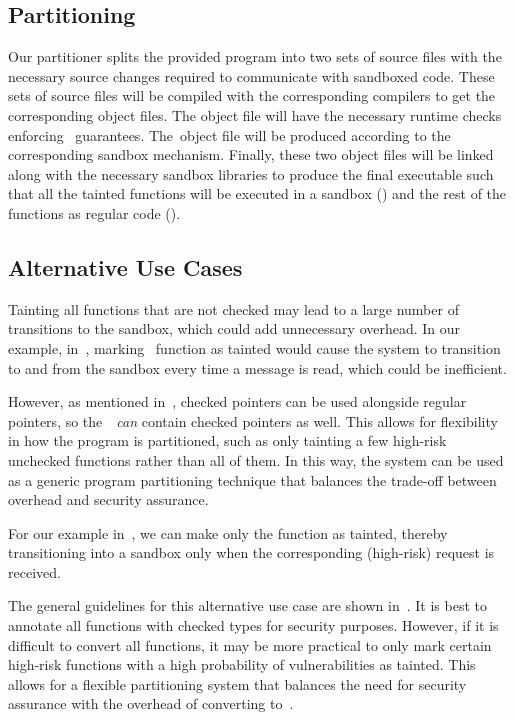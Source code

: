 \subsection{Partitioning}
Our partitioner splits the provided program into two sets of source files with the necessary source changes required to communicate with sandboxed code.
These sets of source files will be compiled with the corresponding compilers to get the corresponding object files.
The \cregion object file will have the necessary runtime checks enforcing~\systemname{} guarantees.
The~\ucregion object file will be produced according to the corresponding sandbox mechanism.
Finally, these two object files will be linked along with the necessary sandbox libraries to produce the final executable such that all the tainted functions will be executed in a sandbox (\ucregion) and the rest of the functions as regular code (\cregion).


\subsection{Alternative Use Cases}


Tainting all functions that are not checked may lead to a large number of transitions to the sandbox, which could add unnecessary overhead. In our example, in~, marking~ function as tainted would cause the system to transition to and from the sandbox every time a message is read, which could be inefficient. 

However, as mentioned in~, checked pointers can be used alongside regular pointers, so the~\cregion{}~\emph{can} contain checked pointers as well.
%
This allows for flexibility in how the program is partitioned, such as only tainting a few high-risk unchecked functions rather than all of them. In this way, the system can be used as a generic program partitioning technique that balances the trade-off between overhead and security assurance.

For our example in~, we can make only the function  as tainted, thereby transitioning into a sandbox only when the corresponding (high-risk) request is received.

The general guidelines for this alternative use case are shown in~.
It is best to annotate all functions with checked types for security purposes. However, if it is difficult to convert all functions, it may be more practical to only mark certain high-risk functions with a high probability of vulnerabilities as tainted. This allows for a flexible partitioning system that balances the need for security assurance with the overhead of converting to~\checkedc.



